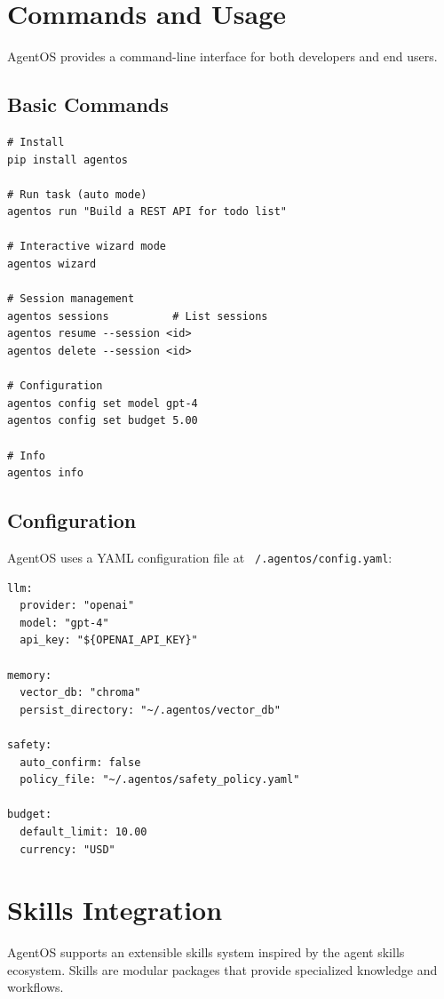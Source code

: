 \documentclass[12pt,a4paper]{article}
\begin{document}
\section{Commands and Usage}

AgentOS provides a command-line interface for both developers and end users.

\subsection{Basic Commands}

\begin{verbatim}
# Install
pip install agentos

# Run task (auto mode)
agentos run "Build a REST API for todo list"

# Interactive wizard mode
agentos wizard

# Session management
agentos sessions          # List sessions
agentos resume --session <id>
agentos delete --session <id>

# Configuration
agentos config set model gpt-4
agentos config set budget 5.00

# Info
agentos info
\end{verbatim}

\subsection{Configuration}

AgentOS uses a YAML configuration file at \texttt{~/.agentos/config.yaml}:

\begin{verbatim}
llm:
  provider: "openai"
  model: "gpt-4"
  api_key: "${OPENAI_API_KEY}"

memory:
  vector_db: "chroma"
  persist_directory: "~/.agentos/vector_db"

safety:
  auto_confirm: false
  policy_file: "~/.agentos/safety_policy.yaml"

budget:
  default_limit: 10.00
  currency: "USD"
\end{verbatim}

\section{Skills Integration}

AgentOS supports an extensible skills system inspired by the agent skills ecosystem. Skills are modular packages that provide specialized knowledge and workflows.
\end{document}
